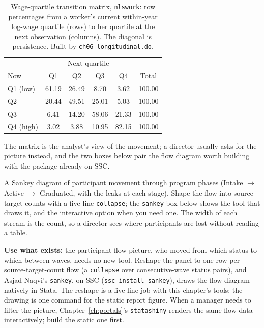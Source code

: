 \documentclass[
    a4paper,
    fontsize=10pt,
    twoside=true,
    numbers=noenddot,
]{kaobook}
\newenvironment{vizcallout}[1][Visualization to build]{%
    \begin{vizbox}[frametitle={#1}]%
}{%
    \end{vizbox}%
}
\begin{document}
\begin{table}[htbp]
\centering
\caption[Wage-quartile transition matrix]{Wage-quartile transition matrix, \texttt{nlswork}: row percentages from a worker's current within-year log-wage quartile (rows) to her quartile at the next observation (columns). The diagonal is persistence. Built by \texttt{ch06\_longitudinal.do}.}
\label{tab:transition}
{\footnotesize
\begin{tabular}{lccccc}
\hline
             & \multicolumn{4}{c}{Next quartile} &        \\
Now          & Q1     & Q2     & Q3     & Q4     & Total  \\
\hline
Q1 (low)     & 61.19  & 26.49  &  8.70  &  3.62  & 100.00 \\
Q2           & 20.44  & 49.51  & 25.01  &  5.03  & 100.00 \\
Q3           &  6.41  & 14.20  & 58.06  & 21.33  & 100.00 \\
Q4 (high)    &  3.02  &  3.88  & 10.95  & 82.15  & 100.00 \\
\hline
\end{tabular}
}
\end{table}

The matrix is the analyst's view of the movement; a director usually asks for the picture instead, and the two boxes below pair the flow diagram worth building with the package already on SSC.

\begin{vizcallout}[Visualization to build: the Sankey flow]
A Sankey diagram of participant movement through program phases (Intake $\rightarrow$ Active $\rightarrow$ Graduated, with the leaks at each stage). Shape the flow into source-target counts with a five-line \texttt{collapse}; the \texttt{sankey} box below shows the tool that draws it, and the interactive option when you need one. The width of each stream is the count, so a director sees where participants are lost without reading a table.
\end{vizcallout}

\begin{kaobox}[frametitle=Existing tool: \texttt{sankey} for participant-flow pictures]
\textbf{Use what exists:} the participant-flow picture, who moved from which status to which between waves, needs no new tool. Reshape the panel to one row per source-target-count flow (a \texttt{collapse} over consecutive-wave status pairs), and Asjad Naqvi's \texttt{sankey}, on SSC (\texttt{ssc install sankey}), draws the flow diagram natively in Stata. The reshape is a five-line job with this chapter's tools; the drawing is one command for the static report figure. When a manager needs to filter the picture, Chapter~\ref{ch:portals}'s \texttt{statashiny} renders the same flow data interactively; build the static one first.
\end{kaobox}
\end{document}
